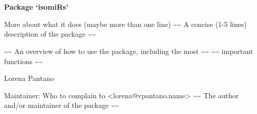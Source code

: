 \documentclass[a4paper]{book}
\begin{document}
\chapter*{}
\begin{center}
{\textbf{\huge Package `isomiRs'}}
\par\bigskip{\large \today}
\end{center}
\begin{description}
\raggedright{}
\item[Type]
\item[Title]
\item[Version]
\item[Imports]
\item[Date]
\item[Author]
\item[Maintainer]\AsIs{}
\item[Description]
\item[License]
\end{description}
%
\begin{Description}\relax
More about what it does (maybe more than one line)
\textasciitilde{}\textasciitilde{} A concise (1-5 lines) description of the package \textasciitilde{}\textasciitilde{}
\end{Description}
%
\begin{Details}\relax

\textasciitilde{}\textasciitilde{} An overview of how to use the package, including the most \textasciitilde{}\textasciitilde{}
\textasciitilde{}\textasciitilde{} important functions \textasciitilde{}\textasciitilde{}
\end{Details}
%
\begin{Author}\relax
Lorena Pantano

Maintainer: Who to complain to <lorena@vpantano.name>
\textasciitilde{}\textasciitilde{} The author and/or maintainer of the package \textasciitilde{}\textasciitilde{}
\end{Author}
\end{document}
